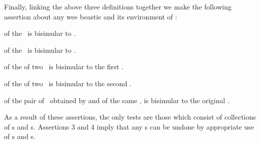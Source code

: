 Finally, linking the above three definitions together we make the 
following assertion about any wee beastie and its environment of \lols: 

\begingroup\startAssertion

\startitemize[n]

\item {} of the  \lol\ is bisimular to 
. 

\item {} of the  \lol\ is bisimular to 
. 

\item {} of the  of two \lols\ is 
bisimular to the first \lol. 

\item {} of the  of two \lols\ is 
bisimular to the second \lol. 

\item {} of the pair of \lols\ obtained by 
 and  of the same \lol, is bisimular 
to the original \lol. 

\stopAssertion\endgroup

As a result of these assertions, the only  tests are 
those which consist of collections of s and 
s. Assertions 3 and 4 imply that any 
s can be undone by appropriate use of 
s and s.  

